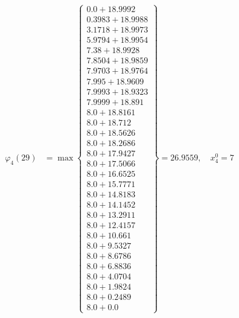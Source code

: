\documentclass{article}
\begin{document}
\begin{align*}
\varphi_{4}(29) &= \max \left\{ \begin{array}{c}
0.0 + 18.9992 \\
 0.3983 + 18.9988 \\
 3.1718 + 18.9973 \\
 5.9794 + 18.9954 \\
 7.38 + 18.9928 \\
 7.8504 + 18.9859 \\
 7.9703 + 18.9764 \\
 7.995 + 18.9609 \\
 7.9993 + 18.9323 \\
 7.9999 + 18.891 \\
 8.0 + 18.8161 \\
 8.0 + 18.712 \\
 8.0 + 18.5626 \\
 8.0 + 18.2686 \\
 8.0 + 17.9427 \\
 8.0 + 17.5066 \\
 8.0 + 16.6525 \\
 8.0 + 15.7771 \\
 8.0 + 14.8183 \\
 8.0 + 14.1452 \\
 8.0 + 13.2911 \\
 8.0 + 12.4157 \\
 8.0 + 10.661 \\
 8.0 + 9.5327 \\
 8.0 + 8.6786 \\
 8.0 + 6.8836 \\
 8.0 + 4.0704 \\
 8.0 + 1.9824 \\
 8.0 + 0.2489 \\
 8.0 + 0.0
\end{array} \right\}=26.9559, \quad x_{4}^0=7\\
  

\end{align*}
\end{document}
